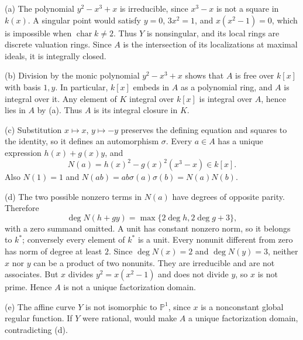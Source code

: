 (a) The polynomial $y^2-x^3+x$ is irreducible, since $x^3-x$ is not a square in $k(x)$. A singular point would satisfy $y=0$, $3x^2=1$, and $x(x^2-1)=0$, which is impossible when $\operatorname{char}k\ne2$. Thus $Y$ is nonsingular, and its local rings are discrete valuation rings. Since $A$ is the intersection of its localizations at maximal ideals, it is integrally closed.

(b) Division by the monic polynomial $y^2-x^3+x$ shows that $A$ is free over $k[x]$ with basis $1,y$. In particular, $k[x]$ embeds in $A$ as a polynomial ring, and $A$ is integral over it. Any element of $K$ integral over $k[x]$ is integral over $A$, hence lies in $A$ by (a). Thus $A$ is its integral closure in $K$.

(c) Substitution $x\mapsto x$, $y\mapsto-y$ preserves the defining equation and squares to the identity, so it defines an automorphism $\sigma$. Every $a\in A$ has a unique expression $h(x)+g(x)y$, and
\[N(a)=h(x)^2-g(x)^2(x^3-x)\in k[x].\]
Also $N(1)=1$ and $N(ab)=ab\sigma(a)\sigma(b)=N(a)N(b)$.

(d) The two possible nonzero terms in $N(a)$ have degrees of opposite parity. Therefore
\[\deg N(h+gy)=\max\{2\deg h,2\deg g+3\},\]
with a zero summand omitted. A unit has constant nonzero norm, so it belongs to $k^*$; conversely every element of $k^*$ is a unit. Every nonunit different from zero has norm of degree at least $2$. Since $\deg N(x)=2$ and $\deg N(y)=3$, neither $x$ nor $y$ can be a product of two nonunits. They are irreducible and are not associates. But $x$ divides $y^2=x(x^2-1)$ and does not divide $y$, so $x$ is not prime. Hence $A$ is not a unique factorization domain.

(e) The affine curve $Y$ is not isomorphic to $\mathbb{P}^1$, since $x$ is a nonconstant global regular function. If $Y$ were rational,  would make $A$ a unique factorization domain, contradicting (d).
